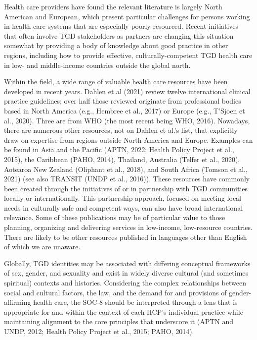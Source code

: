 \documentclass[
]{book}
\begin{document}
Health care providers have found the relevant
literature is largely North American and European,
which present particular challenges for persons
working in health care systems that are especially
poorly resourced. Recent initiatives that often
involve TGD stakeholders as partners are changing this situation somewhat by providing a body
of knowledge about good practice in other
regions, including how to provide effective,
culturally-competent TGD health care in low- and
middle-income countries outside the global north.

Within the field, a wide range of valuable
health care resources have been developed in
recent years. Dahlen et al (2021) review twelve
international clinical practice guidelines; over half
those reviewed originate from professional bodies
based in North America (e.g., Hembree et al.,
2017) or Europe (e.g., T'Sjoen et al., 2020). Three
are from WHO (the most recent being WHO,
2016). Nowadays, there are numerous other
resources, not on Dahlen et al.'s list, that explicitly
draw on expertise from regions outside North
America and Europe. Examples can be found in
Asia and the Pacific (APTN, 2022; Health Policy
Project et al., 2015), the Caribbean (PAHO, 2014),
Thailand, Australia (Telfer et al., 2020), Aotearoa
New Zealand (Oliphant et al., 2018), and South
Africa (Tomson et al., 2021) (see also TRANSIT
(UNDP et al., 2016)). These resources have commonly been created through the initiatives of or
in partnership with TGD communities locally or
internationally. This partnership approach,
focused on meeting local needs in culturally safe
and competent ways, can also have broad international relevance. Some of these publications
may be of particular value to those planning,
organizing and delivering services in low-income,
low-resource countries. There are likely to be
other resources published in languages other than
English of which we are unaware.

Globally, TGD identities may be associated
with differing conceptual frameworks of sex,
gender, and sexuality and exist in widely diverse
cultural (and sometimes spiritual) contexts and
histories. Considering the complex relationships
between social and cultural factors, the law, and
the demand for and provisions of gender-affirming
health care, the SOC-8 should be interpreted
through a lens that is appropriate for and within
the context of each HCP's individual practice
while maintaining alignment to the core principles that underscore it (APTN and UNDP,
2012; Health Policy Project et al., 2015;
PAHO, 2014).
\end{document}
